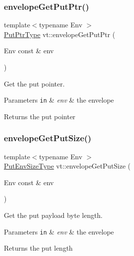 \subsubsection{\texorpdfstring{envelope\+Get\+Put\+Ptr()}{envelopeGetPutPtr()}}
{\footnotesize\ttfamily template$<$typename Env $>$ \\
\hyperlink{namespacevt_a537693bfe0223c71eb52bdbd6ea2c741}{Put\+Ptr\+Type} vt\+::envelope\+Get\+Put\+Ptr (\begin{DoxyParamCaption}\item[{Env const \&}]{env }\end{DoxyParamCaption})\hspace{0.3cm}{\ttfamily [inline]}}



Get the put pointer. 


\begin{DoxyParams}[1]{Parameters}
\mbox{\tt in}  & {\em env} & the envelope\\
\hline
\end{DoxyParams}
\begin{DoxyReturn}{Returns}
the put pointer 
\end{DoxyReturn}
\mbox{\label{namespacevt_abbd3e4684f30ad052e43a1655f540b6f}} 
\subsubsection{\texorpdfstring{envelope\+Get\+Put\+Size()}{envelopeGetPutSize()}}
{\footnotesize\ttfamily template$<$typename Env $>$ \\
\hyperlink{namespacevt_aa241444e21c15238e185923792814fe4}{Put\+Env\+Size\+Type} vt\+::envelope\+Get\+Put\+Size (\begin{DoxyParamCaption}\item[{Env const \&}]{env }\end{DoxyParamCaption})\hspace{0.3cm}{\ttfamily [inline]}}



Get the put payload byte length. 


\begin{DoxyParams}[1]{Parameters}
\mbox{\tt in}  & {\em env} & the envelope\\
\hline
\end{DoxyParams}
\begin{DoxyReturn}{Returns}
the put length 
\end{DoxyReturn}
\mbox{\label{namespacevt_aaf50340390d58fe42775ae5b8e413f28}} 
